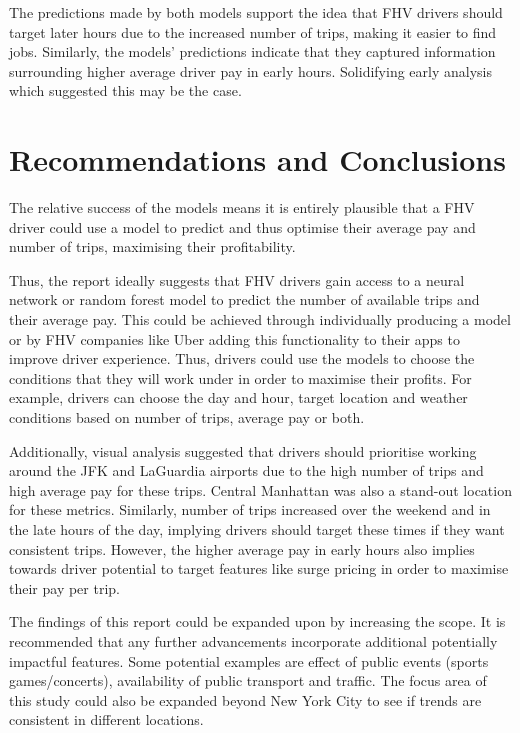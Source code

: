 \documentclass[11pt]{article}
\begin{document}
The predictions made by both models support the idea that FHV drivers should target later hours due to the increased number of trips, making it easier to find jobs. Similarly, the models' predictions indicate that they captured information surrounding higher average driver pay in early hours. Solidifying early analysis which suggested this may be the case.

\section{Recommendations and Conclusions}

The relative success of the models means it is entirely plausible that a FHV driver could use a model to predict and thus optimise their average pay and number of trips, maximising their profitability.

Thus, the report ideally suggests that FHV drivers gain access to a neural network or random forest model to predict the number of available trips and their average pay. This could be achieved through individually producing a model or by FHV companies like Uber adding this functionality to their apps to improve driver experience. Thus, drivers could use the models to choose the conditions that they will work under in order to maximise their profits. For example, drivers can choose the day and hour, target location and weather conditions based on number of trips, average pay or both. 

Additionally, visual analysis suggested that drivers should prioritise working around the JFK and LaGuardia airports due to the high number of trips and high average pay for these trips. Central Manhattan was also a stand-out location for these metrics. Similarly, number of trips increased over the weekend and in the late hours of the day, implying drivers should target these times if they want consistent trips. However, the higher average pay in early hours also implies towards driver potential to target  features like surge pricing in order to maximise their pay per trip.

The findings of this report could be expanded upon by increasing the scope. It is recommended that any further advancements incorporate additional potentially impactful features. Some potential examples are effect of public events (sports games/concerts), availability of public transport and traffic. The focus area of this study could also be expanded beyond New York City to see if trends are consistent in different locations.

\clearpage

\printbibliography
\end{document}
